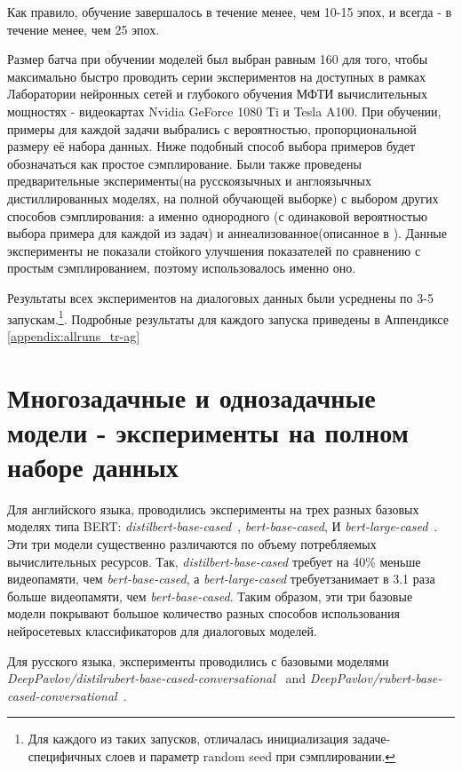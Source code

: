 Как правило, обучение завершалось в течение менее, чем 10-15 эпох, и всегда - в течение менее, чем 25 эпох. 

Размер батча при обучении моделей был выбран равным 160 для того, чтобы максимально быстро проводить серии экспериментов на доступных в рамках Лаборатории нейронных сетей и глубокого обучения МФТИ вычислительных мощностях - видеокартах Nvidia GeForce 1080 Ti и Tesla A100.
При обучении, примеры для каждой задачи выбрались с вероятностью, пропорциональной размеру её набора данных. Ниже подобный способ выбора примеров будет обозначаться как простое сэмплирование. Были также проведены предварительные эксперименты(на русскоязычных и англоязычных дистиллированных моделях, на полной обучающей выборке) с выбором других способов сэмплирования: а именно однородного (с одинаковой вероятностью выбора примера для каждой из задач) и аннеализованное(описанное в \cite{stickland_2019}). Данные эксперименты не показали стойкого улучшения показателей по сравнению с простым сэмплированием, поэтому использовалось именно оно. 

Результаты всех экспериментов на диалоговых данных были усреднены по 3-5 запускам.\footnote{ Для каждого из таких запусков, отличалась инициализация задаче-специфичных слоев и параметр random seed при сэмплировании.}. Подробные результаты для каждого запуска приведены в Аппендиксе \ref{appendix:allruns_tr-ag}

\section{Многозадачные и однозадачные модели - эксперименты на полном наборе данных} 
Для английского языка, проводились эксперименты на трех разных базовых моделях типа BERT: \textit{distilbert-base-cased}~\cite{distilbert}, \textit{bert-base-cased}, И \textit{bert-large-cased}~\cite{bert}.  Эти три модели существенно различаются по объему потребляемых вычислительных ресурсов. Так, 
\textit{distilbert-base-cased} требует на 40\% меньше видеопамяти, чем \textit{bert-base-cased}, а \textit{bert-large-cased} требуетзанимает в  3.1 раза больше видеопамяти, чем \textit{bert-base-cased}. Таким образом, эти три базовые модели покрывают большое количество разных способов использования нейросетевых классификаторов для диалоговых моделей. 

Для русского языка, эксперименты проводились с базовыми моделями \textit{DeepPavlov/distilrubert-base-cased-conversational}~\cite{distilrubert} and \textit{DeepPavlov/rubert-base-cased-conversational}~\cite{rubert}.

